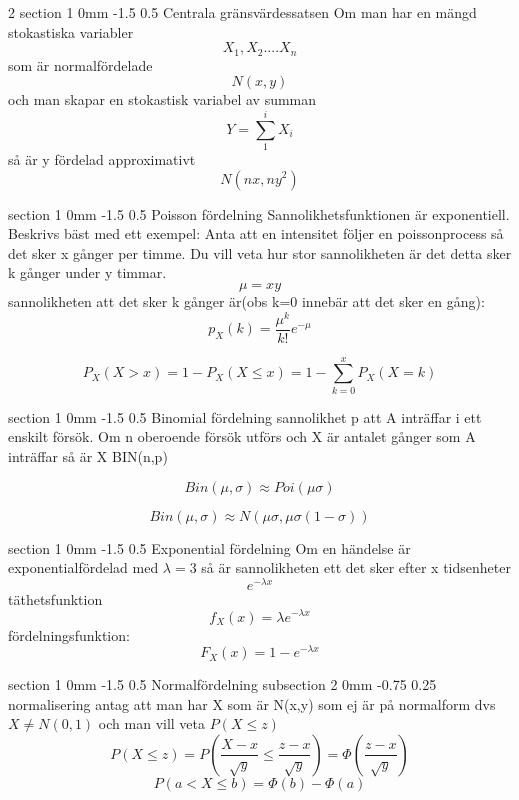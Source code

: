 \documentclass[a4paper,11pt]{article}
\makeatletter
\renewcommand{\section}{\@startsection
   {section}%
   {1}%
   {0mm}%
   {-1.5\baselineskip}%
   {0.5\baselineskip}%
   {\sffamily\bfseries\upshape\normalsize}}%
\renewcommand{\subsection}{\@startsection
   {subsection}%
   {2}%
   {0mm}%
   {-0.75\baselineskip}%
   {0.25\baselineskip}%
   {\rmfamily\normalfont\slshape\normalsize}}%
\makeatother
\begin{document}
\begin{multicols}{2}
 \section{Centrala gränsvärdessatsen}
 Om man har en mängd stokastiska variabler
 $$X_1,X_2....X_n$$
 som är normalfördelade 
 $$N(x,y)$$
 och man skapar en stokastisk variabel av summan
 $$Y=\sum_1^iX_i$$
 så är y fördelad approximativt
 $$N(nx,ny^2)$$
 
 \section{Poisson fördelning}
 Sannolikhetsfunktionen är exponentiell. Beskrivs bäst med ett exempel:
 Anta att en intensitet följer en poissonprocess så det sker x gånger per timme. Du vill veta hur stor sannolikheten är det detta sker k gånger under y timmar.
 $$\mu=xy$$
 sannolikheten att det sker k gånger är(obs k=0 innebär att det sker en gång):
 $$p_X(k)=\frac{\mu^k}{k!}e^{-\mu}$$
 
 $$P_X(X>x)=1-P_X(X\leq x)=1-\sum_{k=0}^{x}{P_X(X=k)}$$
 
 \section{Binomial fördelning}
 sannolikhet p att A inträffar i ett enskilt försök. Om n oberoende försök utförs och X är antalet gånger som A inträffar så är X  BIN(n,p)
 
 $$Bin(\mu,\sigma)\approx Poi(\mu \sigma)$$
 
 $$Bin(\mu,\sigma)\approx N(\mu \sigma,\mu \sigma(1-\sigma))$$
  
 \section{Exponential fördelning}
Om en händelse är exponentialfördelad med $\lambda=3$ så är sannolikheten ett det sker efter x tidsenheter
$$e^{-\lambda x}$$
täthetsfunktion
$$f_X(x)=\lambda e^{-\lambda x}$$
fördelningsfunktion:
$$F_X(x)=1-e^{-\lambda x}$$
 
 \section{Normalfördelning}
 \subsection{normalisering}
 antag att man har X som är N(x,y) som ej är på normalform dvs $X\neq N(0,1)$
 och man vill veta $P(X\leq z)$
 $$P(X\leq z)=P(\frac{X-x}{\sqrt y}\leq \frac{z-x}{\sqrt y})=\Phi(\frac{z-x}{\sqrt y})$$
$$P(a<X\leq b)=\Phi{(b)}-\Phi{(a)}$$
\end{multicols}
\end{document}
